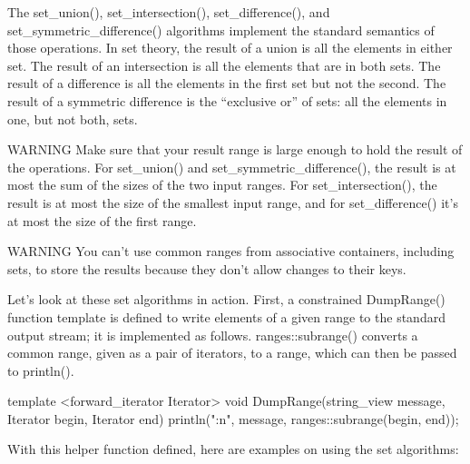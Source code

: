 The set\_union(), set\_intersection(), set\_difference(), and set\_symmetric\_difference() algorithms implement the standard semantics of those operations. In set theory, the result of a union is all the elements in either set. The result of an intersection is all the elements that are in both sets. The result of a difference is all the elements in the first set but not the second. The result of a symmetric difference is the “exclusive or” of sets: all the elements in one, but not both, sets.

\begin{myWarning}{WARNING}
Make sure that your result range is large enough to hold the result of the operations. For set\_union() and set\_symmetric\_difference(), the result is at most the sum of the sizes of the two input ranges. For set\_intersection(), the result is at most the size of the smallest input range, and for set\_difference() it’s at most the size of the first range.
\end{myWarning}

\begin{myWarning}{WARNING}
You can’t use common ranges from associative containers, including sets, to store the results because they don’t allow changes to their keys.
\end{myWarning}

Let’s look at these set algorithms in action. First, a constrained DumpRange() function template is defined to write elements of a given range to the standard output stream; it is implemented as follows. ranges::subrange() converts a common range, given as a pair of iterators, to a range, which can then be passed to println().

\begin{cpp}
template <forward_iterator Iterator>
void DumpRange(string_view message, Iterator begin, Iterator end)
{
    println("{}{:n}", message, ranges::subrange(begin, end));
}
\end{cpp}

With this helper function defined, here are examples on using the set algorithms:

